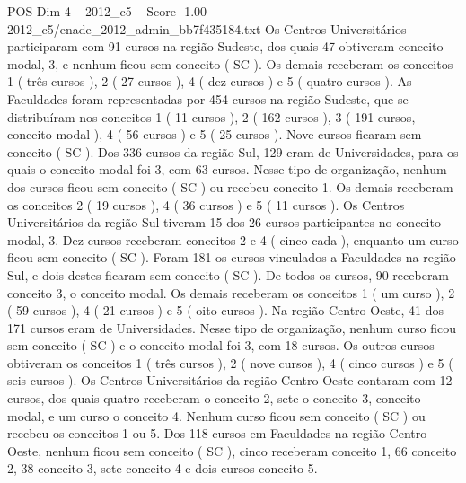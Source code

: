 \begin{textsample}{POS Dim 4 – 2012\_c5 – Score -1.00 – 2012\_c5/enade\_2012\_admin\_bb7f435184.txt}
Os Centros Universitários participaram com 91 cursos na região Sudeste, dos quais 47 obtiveram conceito modal, 3, e nenhum ficou sem conceito ( SC ).
Os demais receberam os conceitos 1 ( três cursos ), 2 ( 27 cursos ), 4 ( dez cursos ) e 5 ( quatro cursos ).
As Faculdades foram representadas por 454 cursos na região Sudeste, que se distribuíram nos conceitos 1 ( 11 cursos ), 2 ( 162 cursos ), 3 ( 191 cursos, conceito modal ), 4 ( 56 cursos ) e 5 ( 25 cursos ).
Nove cursos ficaram sem conceito ( SC ).
Dos 336 cursos da região Sul, 129 eram de Universidades, para os quais o conceito modal foi 3, com 63 cursos.
Nesse tipo de organização, nenhum dos cursos ficou sem conceito ( SC ) ou recebeu conceito 1.
Os demais receberam os conceitos 2 ( 19 cursos ), 4 ( 36 cursos ) e 5 ( 11 cursos ).
Os Centros Universitários da região Sul tiveram 15 dos 26 cursos participantes no conceito modal, 3.
Dez cursos receberam conceitos 2 e 4 ( cinco cada ), enquanto um curso ficou sem conceito ( SC ).
Foram 181 os cursos vinculados a Faculdades na região Sul, e dois destes ficaram sem conceito ( SC ).
De todos os cursos, 90 receberam conceito 3, o conceito modal.
Os demais receberam os conceitos 1 ( um curso ), 2 ( 59 cursos ), 4 ( 21 cursos ) e 5 ( oito cursos ).
Na região Centro-Oeste, 41 dos 171 cursos eram de Universidades.
Nesse tipo de organização, nenhum curso ficou sem conceito ( SC ) e o conceito modal foi 3, com 18 cursos.
Os outros cursos obtiveram os conceitos 1 ( três cursos ), 2 ( nove cursos ), 4 ( cinco cursos ) e 5 ( seis cursos ).
Os Centros Universitários da região Centro-Oeste contaram com 12 cursos, dos quais quatro receberam o conceito 2, sete o conceito 3, conceito modal, e um curso o conceito 4.
Nenhum curso ficou sem conceito ( SC ) ou recebeu os conceitos 1 ou 5.
Dos 118 cursos em Faculdades na região Centro-Oeste, nenhum ficou sem conceito ( SC ), cinco receberam conceito 1, 66 conceito 2, 38 conceito 3, sete conceito 4 e dois cursos conceito 5.

\end{textsample}
